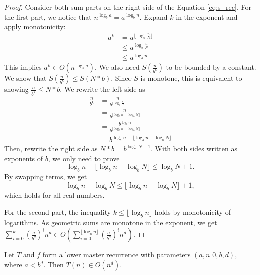 \begin{proof}
    Consider both sum parts on the right side of the Equation \ref{eq:s_rec}.
    For the first part, we notice that $n^{\log_b{a}} = a^{\log_b{n}}$.
    Expand $k$ in the exponent and apply monotonicity:
    \begin{align*}
        a^k &= a^{\lfloor \log_b{\frac{n}{N}} \rfloor} \\
            &\leq a^{\log_b{\frac{n}{N}}} \\
            &\leq a^{\log_b{n}}
    \end{align*}
    This implies $a^k \in O(n^{\log_b{a}})$. We also need $S(\frac{n}{b^k})$ to
    be bounded by a constant. We show that $S(\frac{n}{b^k}) \leq S(N*b)$.
    Since $S$ is monotone, this is equivalent to showing 
    $\frac{n}{b^k} \leq N*b$. We rewrite the left side as
    \begin{align*}
        \frac{n}{b^k} &= \frac{n}{b^{\lfloor \log_b{\frac{n}{N}} \rfloor}} \\
                      &= \frac{n}{b^{\lfloor \log_b{n} - \log_b{N} \rfloor}} \\
                      &= \frac{b^{\log_b{n}}}
                              {b^{\lfloor \log_b{n} - \log_b{N} \rfloor}} \\
                      &= b^{\log_b{n} - 
                            \lfloor \log_b{n} - \log_b{N} \rfloor}
    \end{align*}
    Then, rewrite the right side as $N*b = b^{\log_b{N} + 1}$. With both 
    sides written as exponents of $b$, we only need to prove
    \[\log_b{n} - \lfloor \log_b{n} - \log_b{N} \rfloor \leq \log_b{N} + 1.\]
    By swapping terms, we get
    \[\log_b{n} - \log_b{N} \leq \lfloor \log_b{n} - \log_b{N} \rfloor + 1,\]
    which holds for all real numbers. 

    For the second part, the inequality $k \leq \lfloor \log_b{n} \rfloor$ 
    holds by monotonicity of logarithms. As geometric sums are monotone in 
    the exponent, we get $\sum_{i=0}^k (\frac{a}{b^d})^i n^d \in 
    O(\sum_{i=0}^{\lfloor \log_b{n} \rfloor} (\frac{a}{b^d})^i n^d)$.
\end{proof}

\begin{theorem}
    \label{thm:lower_master_rec_big_o_of_lt}
    \leanok
    Let $T$ and $f$ form a lower master recurrence with parameters 
    $(a, n\_0, b, d)$, where $a < b^d$. Then $T(n) \in O(n^d)$.
\end{theorem}

